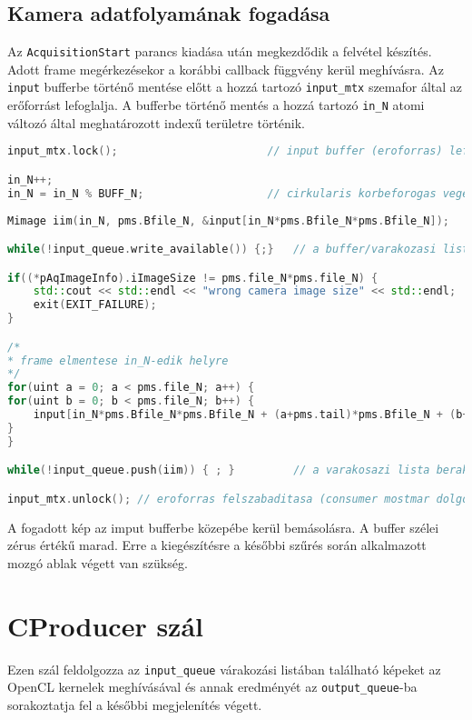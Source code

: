 	\subsection*{Kamera adatfolyamának fogadása}
	Az \texttt{AcquisitionStart} parancs kiadása után megkezdődik a felvétel készítés. Adott frame megérkezésekor a korábbi callback
	függvény kerül meghívásra. Az \texttt{input} bufferbe történő mentése előtt a hozzá tartozó \texttt{input\_mtx}
	szemafor által az erőforrást lefoglalja. A bufferbe történő mentés a hozzá tartozó \texttt{in\_N} atomi változó által
	meghatározott indexű területre történik.
	
\begin{lstlisting}[language=C++]
input_mtx.lock();						// input buffer (eroforras) lefoglalasa

in_N++;
in_N = in_N % BUFF_N;					// cirkularis korbeforogas vegett
 
Mimage iim(in_N, pms.Bfile_N, &input[in_N*pms.Bfile_N*pms.Bfile_N]);

while(!input_queue.write_available()) {;}	// a buffer/varakozasi lista kiurulesere varas

if((*pAqImageInfo).iImageSize != pms.file_N*pms.file_N) {
	std::cout << std::endl << "wrong camera image size" << std::endl;
	exit(EXIT_FAILURE);
}

/*
* frame elmentese in_N-edik helyre
*/
for(uint a = 0; a < pms.file_N; a++) {
for(uint b = 0; b < pms.file_N; b++) {
	input[in_N*pms.Bfile_N*pms.Bfile_N + (a+pms.tail)*pms.Bfile_N + (b+pms.tail)] = (*pAqImageInfo).pImageBuffer[a*pms.file_N + b];
}
}

while(!input_queue.push(iim)) { ; }			// a varakosazi lista berakas

input_mtx.unlock(); // eroforras felszabaditasa (consumer mostmar dolgozhat rajta)
\end{lstlisting}
	
	A fogadott kép az imput bufferbe közepébe kerül bemásolásra. A buffer szélei zérus értékű marad. Erre a kiegészítésre a későbbi
	szűrés során alkalmazott mozgó ablak végett van szükség.
	
\section{CProducer szál}
Ezen szál feldolgozza az \texttt{input\_queue} várakozási listában található képeket az OpenCL kernelek meghívásával és annak
eredményét az \texttt{output\_queue}-ba sorakoztatja fel a későbbi megjelenítés végett.
	
